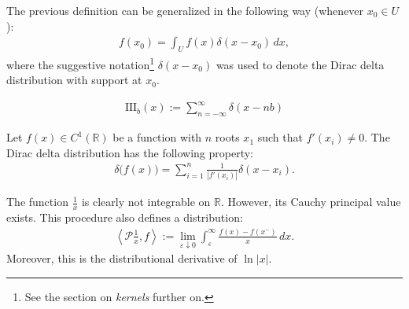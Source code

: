	\begin{property}
    	The previous definition can be generalized in the following way (whenever $x_0\in U$):
    	\begin{gather}
			\label{distribution:sieving_dirac_delta}
			f(x_0) = \int_Uf(x)\delta(x - x_0)\,dx,
		\end{gather}
		where the suggestive notation\footnote{See the section on \textit{kernels} further on.} $\delta(x-x_0)$ was used to denote the Dirac delta distribution with support at $x_0$.
	\end{property}

	\begin{definition}\label{distribution:dirac_comb}
    	\begin{gather}
			\mathrm{III}_b(x) := \sum_{n=-\infty}^\infty\delta(x-nb)
		\end{gather}
	\end{definition}

	\begin{property}[Transformation]\label{distribution:delta_of_function}
		Let $f(x)\in C^1(\mathbb{R})$ be a function with $n$ roots $x_1$ such that $f'(x_i)\neq0$. The Dirac delta distribution has the following property:
		\begin{gather}
			\delta\big(f(x)\big) = \sum_{i=1}^n\frac{1}{|f'(x_i)|}\delta(x-x_i).
		\end{gather}
	\end{property}


    \begin{example}
        The function $\frac{1}{x}$ is clearly not integrable on $\mathbb{R}$. However, its Cauchy principal value exists. This procedure also defines a distribution:
        \begin{gather}
            \left\langle\mathcal{P}\frac{1}{x},f\right\rangle := \lim_{\varepsilon\downarrow0}\int_\varepsilon^\infty\frac{f(x)-f(x^-)}{x}\,dx.
        \end{gather}
        Moreover, this is the distributional derivative of $\ln|x|$.
    \end{example}

